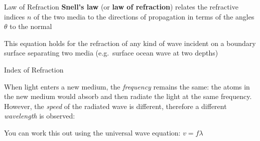 \documentclass[compress,aspectratio=169]{beamer}
\newcommand{\pic}[2]{\texttt{[image: \#2]}}
\newcommand{\eq}[2]{\vspace{#1}{\LARGE\begin{displaymath}#2\end{displaymath}}}
\begin{document}
\begin{frame}{Law of Refraction}
  \textbf{Snell's law} (or \textbf{law of refraction}) relates the refractive
  indices $n$ of the two media to the directions of propagation in terms of the
  angles $\theta$ to the normal

  \eq{-.2in}{
    \boxed{n_1\sin\theta_1=n_2\sin\theta_2}
  }

  This equation holds for the refraction of any kind of wave incident on a
  boundary surface separating two media (e.g.\ surface ocean wave at two
  depths)
\end{frame}



%    



\begin{frame}{Index of Refraction}
%

  When light enters a new medium, the \emph{frequency} remains the same: the
  atoms in the new medium would absorb and then radiate the light at the same
  frequency. However, the \emph{speed} of the radiated wave is different,
  therefore a different \emph{wavelength} is observed:
    
  \eq{-.2in}{
    \boxed{\frac{n_1}{n_2}=\frac{\lambda_2}{\lambda_1}}
  }

  You can work this out using the universal wave equation: $v=f\lambda$
\end{frame}
\end{document}
